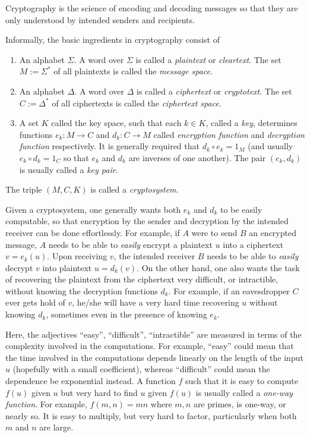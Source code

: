 \documentclass[12pt]{article}
\begin{document}
Cryptography is the science of encoding and decoding messages so that they are only understood by intended senders and recipients.

Informally, the basic ingredients in cryptography consist of 
\begin{enumerate}
\item An alphabet $\Sigma$.  A word over $\Sigma$ is called a \emph{plaintext} or \emph{cleartext}.  The set $M:=\Sigma^*$ of all plaintexts is called the \emph{message space}.
\item An alphabet $\Delta$.  A word over $\Delta$ is called a \emph{ciphertext} or \emph{cryptotext}.  The set $C:=\Delta^*$ of all ciphertexts is called the \emph{ciphertext space}.
\item A set $K$ called the key space, such that each $k\in K$, called a \emph{key}, determines functions $e_k: M\to C$ and $d_k:C\to M$ called \emph{encryption function} and \emph{decryption function} respectively.  It is generally required that $d_k\circ e_k = 1_M$ (and usually $e_k\circ d_k=1_C$ so that $e_k$ and $d_k$ are inverses of one another).  The pair $(e_k,d_k)$ is usually called a \emph{key pair}.
\end{enumerate}
The triple $(M,C,K)$ is called a \emph{cryptosystem}.

Given a cryptosystem, one generally wants both $e_k$ and $d_k$ to be easily computable, so that encryption by the sender and decryption by the intended receiver can be done effortlessly.  For example, if $A$ were to send $B$ an encrypted message, $A$ needs to be able to \emph{easily} encrypt a plaintext $u$ into a ciphertext $v=e_k(u)$.  Upon receiving $v$, the intended receiver $B$ needs to be able to \emph{easily} decrypt $v$ into plaintext $u=d_k(v)$.  On the other hand, one also wants the task of recovering the plaintext from the ciphertext very difficult, or intractible, without knowing the decryption functions $d_k$.  For example, if an eavesdropper $C$ ever gets hold of $v$, he/she will have a very hard time recovering $u$ without knowing $d_k$, sometimes even in the presence of knowing $e_k$.

Here, the adjectives ``easy'', ``difficult'', ``intractible'' are measured in terms of the complexity involved in the computations.  For example, ``easy'' could mean that the time involved in the computations depends linearly on the length of the input $u$ (hopefully with a small coefficient), whereas ``difficult'' could mean the dependence be exponential instead.  A function $f$ such that it is easy to compute $f(u)$ given $u$ but very hard to find $u$ given $f(u)$ is usually called a \emph{one-way function}.  For example, $f(m,n)=mn$ where $m,n$ are primes, is one-way, or nearly so.  It is easy to multiply, but very hard to factor, particularly when both $m$ and $n$ are large.
\end{document}
